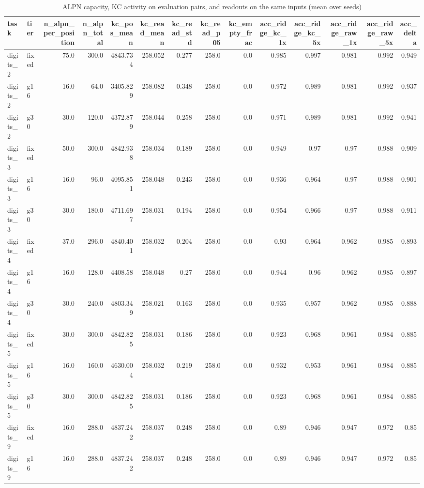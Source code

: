 \begin{table}[t]
\centering
\small
\begin{tabular}{llrrrrrrrrrrrr}
\toprule
task & tier & n\_alpn\_per\_position & n\_alpn\_total & kc\_pos\_mean & kc\_read\_mean & kc\_read\_std & kc\_read\_p05 & kc\_empty\_frac & acc\_ridge\_kc\_1x & acc\_ridge\_kc\_5x & acc\_ridge\_raw\_1x & acc\_ridge\_raw\_5x & acc\_delta \\
\midrule
digits\_2 & fixed & 75.0 & 300.0 & 4843.734 & 258.052 & 0.277 & 258.0 & 0.0 & 0.985 & 0.997 & 0.981 & 0.992 & 0.949 \\
digits\_2 & g16 & 16.0 & 64.0 & 3405.829 & 258.082 & 0.348 & 258.0 & 0.0 & 0.972 & 0.989 & 0.981 & 0.992 & 0.937 \\
digits\_2 & g30 & 30.0 & 120.0 & 4372.879 & 258.044 & 0.258 & 258.0 & 0.0 & 0.971 & 0.989 & 0.981 & 0.992 & 0.941 \\
digits\_3 & fixed & 50.0 & 300.0 & 4842.938 & 258.034 & 0.189 & 258.0 & 0.0 & 0.949 & 0.97 & 0.97 & 0.988 & 0.909 \\
digits\_3 & g16 & 16.0 & 96.0 & 4095.851 & 258.048 & 0.243 & 258.0 & 0.0 & 0.936 & 0.964 & 0.97 & 0.988 & 0.901 \\
digits\_3 & g30 & 30.0 & 180.0 & 4711.697 & 258.031 & 0.194 & 258.0 & 0.0 & 0.954 & 0.966 & 0.97 & 0.988 & 0.911 \\
digits\_4 & fixed & 37.0 & 296.0 & 4840.401 & 258.032 & 0.204 & 258.0 & 0.0 & 0.93 & 0.964 & 0.962 & 0.985 & 0.893 \\
digits\_4 & g16 & 16.0 & 128.0 & 4408.58 & 258.048 & 0.27 & 258.0 & 0.0 & 0.944 & 0.96 & 0.962 & 0.985 & 0.897 \\
digits\_4 & g30 & 30.0 & 240.0 & 4803.349 & 258.021 & 0.163 & 258.0 & 0.0 & 0.935 & 0.957 & 0.962 & 0.985 & 0.888 \\
digits\_5 & fixed & 30.0 & 300.0 & 4842.825 & 258.031 & 0.186 & 258.0 & 0.0 & 0.923 & 0.968 & 0.961 & 0.984 & 0.885 \\
digits\_5 & g16 & 16.0 & 160.0 & 4630.004 & 258.032 & 0.219 & 258.0 & 0.0 & 0.932 & 0.953 & 0.961 & 0.984 & 0.885 \\
digits\_5 & g30 & 30.0 & 300.0 & 4842.825 & 258.031 & 0.186 & 258.0 & 0.0 & 0.923 & 0.968 & 0.961 & 0.984 & 0.885 \\
digits\_9 & fixed & 16.0 & 288.0 & 4837.242 & 258.037 & 0.248 & 258.0 & 0.0 & 0.89 & 0.946 & 0.947 & 0.972 & 0.85 \\
digits\_9 & g16 & 16.0 & 288.0 & 4837.242 & 258.037 & 0.248 & 258.0 & 0.0 & 0.89 & 0.946 & 0.947 & 0.972 & 0.85 \\
\bottomrule
\end{tabular}
\caption{ALPN capacity, KC activity on evaluation pairs, and readouts on the same inputs (mean over seeds)}
\label{tab:capacity_kc_stats}
\end{table}